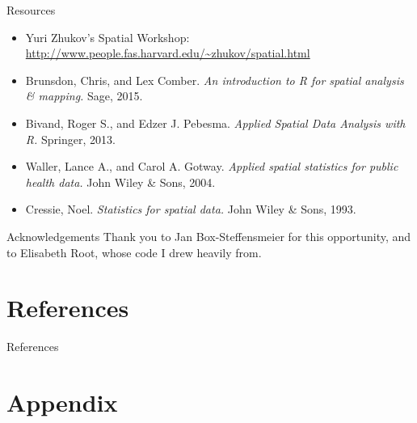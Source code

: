 \documentclass[aspectratio = 169, 12pt]{beamer}\usepackage[]{graphicx}\usepackage[]{color}
\begin{document}
\begin{frame}{Resources}
\begin{itemize}
\item Yuri Zhukov's Spatial Workshop: \url{http://www.people.fas.harvard.edu/~zhukov/spatial.html}
\item Brunsdon, Chris, and Lex Comber. \textit{An introduction to R for spatial analysis \& mapping.} Sage, 2015.
\item Bivand, Roger S., and Edzer J. Pebesma. \textit{Applied Spatial Data Analysis with R.} Springer, 2013.
\item Waller, Lance A., and Carol A. Gotway. \textit{Applied spatial statistics for public health data.} John Wiley \& Sons, 2004.
\item Cressie, Noel. \textit{Statistics for spatial data.} John Wiley \& Sons, 1993.
\end{itemize}
\end{frame}

\begin{frame}{Acknowledgements}
Thank you to Jan Box-Steffensmeier for this opportunity, and to Elisabeth Root, whose code I drew heavily from.
\end{frame}


\section*{References}     %

\begin{frame}{References}

\end{frame}

\section*{Appendix}     %
\subsection*{}

\begin{frame}{}
\end{frame}
\end{document}

